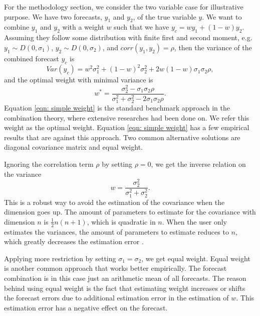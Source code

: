\documentclass[11pt]{article}
\begin{document}
For the methodology section, we consider the two variable case for illustrative purpose. We have
two forecasts, \(y_1\) and \(y_2\), of the true variable \(y\). We want
to combine \(y_1\) and \(y_2\) with a weight \(w\) such that we have
\(y_c = w y_1 + (1-w) y_2\). Assuming they follow some distribution with finite first and second moment, e.g.
\(y_1 \sim D(0,\sigma_1)\), \(y_2 \sim D(0,\sigma_2)\), and
\(corr(y_1,y_2)=\rho\), then the variance of the combined forecast
\(y_c\) is
\begin{equation}
\label{eqn: var yc}
Var(y_c) = w^2\sigma_1^2+ (1-w)^2\sigma_2^2+2w(1-w)\sigma_1\sigma_2\rho,
\end{equation}
and the optimal weight with minimal variance is
\begin{equation}
\label{eqn: simple weight}
w^*=\frac{\sigma_2^2-\sigma_1\sigma_2\rho}{\sigma_1^2+\sigma_2^2 -2\sigma_1\sigma_2\rho}.
\end{equation}
Equation \ref{eqn: simple weight} is the standard benchmark approach in
the combination theory, where extensive researches had been done on. We refer this weight as the optimal weight. Equation \ref{eqn: simple weight} has a few
empirical results that are against this approach. Two common
alternative solutions are diagonal covariance matrix and equal weight.

Ignoring the correlation term \(\rho\) by setting \(\rho=0\), we get the
inverse relation on the variance
\begin{equation}
\label{eqn: simple weight no corr}
w=\frac{\sigma_2^2}{\sigma_1^2+\sigma_2^2}.
\end{equation}
This is a robust way to avoid the estimation of the covariance when the
dimension goes up. The amount of parameters to estimate for the
covariance with dimension \(n\) is \(\frac{1}{2}n(n+1)\), which is
quadratic in \(n\). When the user only estimates the variances, the
amount of parameters to estimate reduces to \(n\), which greatly
decreases the estimation error \cite{Stock2001}.

Applying more restriction by setting $\sigma_1=\sigma_2$, we get equal weight. Equal weight is another common approach that works better empirically.
\cite{Clemen1989} The forecast combination is in this case just an
arithmetic mean of all forecasts. The reason behind using equal weight is the fact
that estimating weight increases or shifts the forecast errors due to
additional estimation error in the estimation of \(w\). This estimation error has a negative effect on the forecast.
\end{document}

